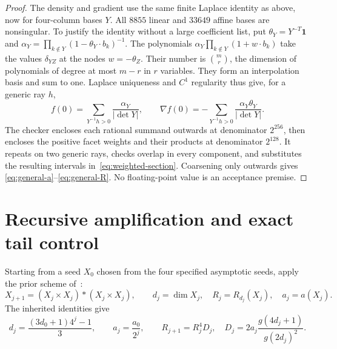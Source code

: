 \documentclass[11pt]{article}
\begin{document}
\begin{proof}
The density and gradient use the same finite Laplace identity as above,
now for four-column bases $Y$. All $8855$ linear and $33649$ affine
bases are nonsingular. To justify the identity without a large
coefficient list, put $\theta_Y=Y^{-T}\boldsymbol1$ and
$\alpha_Y=\prod_{k\notin Y}(1-\theta_Y\cdot b_k)^{-1}$.
The polynomials $\alpha_Y\prod_{k\notin Y}(1+w\cdot b_k)$ take the
values $\delta_{YZ}$ at the nodes $w=-\theta_Z$. Their number is
$\binom mr$, the dimension of polynomials of degree at most $m-r$
in $r$ variables. They form an interpolation basis and sum to one.
Laplace uniqueness and $C^1$ regularity thus give, for a generic ray $h$,
\[
 f(0)=\sum_{Y^{-1}h>0}\frac{\alpha_Y}{|\det Y|},\qquad
 \nabla f(0)=-\sum_{Y^{-1}h>0}\frac{\alpha_Y\theta_Y}{|\det Y|}.
\]
The checker encloses each rational summand outwards at denominator
$2^{256}$, then encloses the positive facet weights and their products
at denominator $2^{128}$. It repeats on two generic rays, checks
overlap in every component, and substitutes the resulting intervals
in~\eqref{eq:weighted-section}. Coarsening only outwards gives
\eqref{eq:general-a}--\eqref{eq:general-R}.
No floating-point value is an acceptance premise.
\end{proof}

\section{Recursive amplification and exact tail control}
Starting from a seed $X_0$ chosen from the four specified asymptotic seeds,
apply the prior scheme
of~\cite[Section 9]{mxym-calculus}:
\begin{equation}\label{eq:recursion}
 X_{j+1}=(X_j\times X_j)*(X_j\times X_j),\qquad
 d_j=\dim X_j,\quad R_j=R_{d_j}(X_j),\quad a_j=a(X_j).
\end{equation}
The inherited identities give
\begin{equation}\label{eq:state-recurrence}
 d_j=\frac{(3d_0+1)4^j-1}{3},\qquad a_j=\frac{a_0}{2^j},\qquad
 R_{j+1}=R_j^4D_j,\quad
 D_j=2a_j\frac{g(4d_j+1)}{g(2d_j)^2}.
\end{equation}
\end{document}
